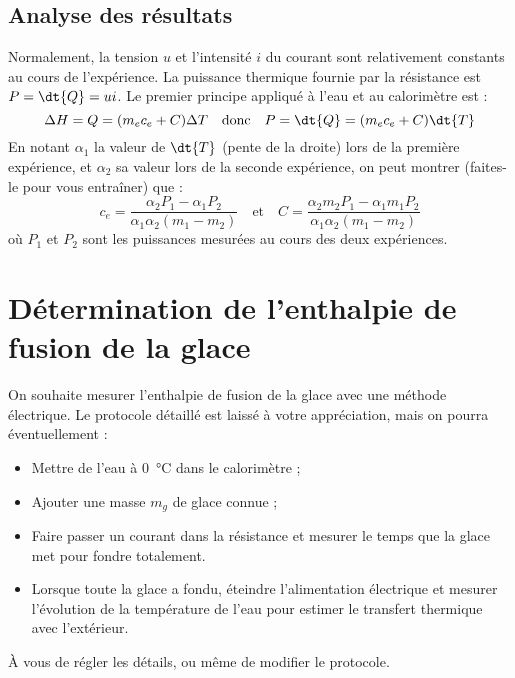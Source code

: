 \documentclass[]{tp}
\begin{document}
\subsection{Analyse des résultats}%
\label{sub:Analyse des résultats}
Normalement, la tension $u$ et l'intensité $i$ du courant sont relativement constants au cours de l'expérience. La puissance thermique fournie par la résistance est $P=\dt{Q}=ui$. Le premier principe appliqué à l'eau et au calorimètre est :
\begin{equation}
  \Delta H = Q = (m_ec_e + C)\Delta T \quad \text{donc} \quad P = \dt{Q} = (m_ec_e + C) \dt{T}
\end{equation}
En notant $\alpha_1$ la valeur de $\dt{T}$ (pente de la droite) lors de la première expérience, et $\alpha_2$ sa valeur lors de la seconde expérience, on peut montrer (faites-le pour vous entraîner) que :
\begin{equation}
c_e = \frac{\alpha_2 P_1 - \alpha_1P_2}{\alpha_1\alpha_2(m_1-m_2)} \quad \text{et} \quad C = \frac{\alpha_2 m_2 P_1 - \alpha_1m_1P_2}{\alpha_1\alpha_2(m_1-m_2)}
\end{equation}
où $P_1$ et $P_2$ sont les puissances mesurées au cours des deux expériences.

\section{Détermination de l'enthalpie de fusion de la glace}

On souhaite mesurer l'enthalpie de fusion de la glace avec une méthode électrique. Le protocole détaillé est laissé à votre appréciation, mais on pourra éventuellement :
\begin{itemize}
  \item Mettre de l'eau à \SI{0}{\celsius} dans le calorimètre ;
  \item Ajouter une masse $m_g$ de glace connue ;
  \item Faire passer un courant dans la résistance et mesurer le temps que la glace met pour fondre totalement.
  \item Lorsque toute la glace a fondu, éteindre l'alimentation électrique et mesurer l'évolution de la température de l'eau pour estimer le transfert thermique avec l'extérieur.
\end{itemize}
À vous de régler les détails, ou même de modifier le protocole.
\end{document}
